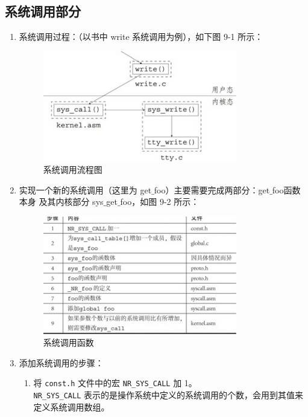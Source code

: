 \subsection{系统调用部分}
    \begin{enumerate}
        \item 系统调用过程：（以书中 write 系统调用为例），如下图 9-1 所示：
        \begin{figure}[H]
            \centering
            \includegraphics[width=0.8\textwidth]{figures/chapter9/9-1.jpg}
            \caption{系统调用流程图}
        \end{figure}
        
        \item 实现一个新的系统调用（这里为 get$\_$foo）主要需要完成两部分：get$\_$foo函数本身 及其内核部分 sys$\_$get$\_$foo，如图 9-2 所示：
        \begin{figure}[H]
            \centering
            \includegraphics[width=0.8\textwidth]{figures/chapter9/9-2.jpg}
            \caption{系统调用函数}
        \end{figure}
        
        \item 添加系统调用的步骤：
        \begin{enumerate}
            \item 将 \texttt{const.h} 文件中的宏 \texttt{NR\_SYS\_CALL} 加 1。\\
            \texttt{NR\_SYS\_CALL} 表示的是操作系统中定义的系统调用的个数，会用到其值来定义系统调用数组。
            

\end{enumerate}
\end{enumerate}
